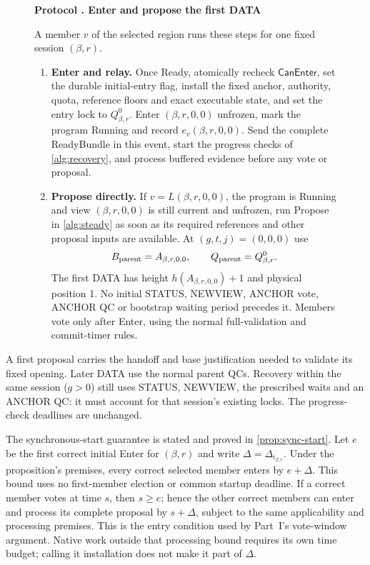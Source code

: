 \documentclass[11pt,a4paper]{article}
\newcommand{\tagg}[1]{\ensuremath{\mathsf{#1}}}
\newcounter{protocol}
\newenvironment{protocol}[3][htbp]{\begin{figure}[#1]\refstepcounter{protocol}\label{#2}
\begin{mdframed}[linewidth=.6pt,skipabove=0pt,skipbelow=0pt,
innertopmargin=7pt,innerbottommargin=7pt]\small
\textbf{Protocol \theprotocol. #3}\par\smallskip}{\end{mdframed}\end{figure}}
\begin{document}
\begin{protocol}[H]{alg:bootstrap}{Enter and propose the first DATA}
A member $v$ of the selected region runs these steps for one fixed
session $(\beta,r)$.
\begin{enumerate}[label=\textbf{\arabic*)},itemsep=3pt]
\item \textbf{Enter and relay.} Once Ready, atomically recheck
\tagg{CanEnter}, set the durable initial-entry flag, install the fixed
anchor, authority, quota, reference floors and exact executable state,
and set the entry lock to $Q^0_{\beta,r}$. Enter $(\beta,r,0,0)$
unfrozen, mark the program Running and record $e_v(\beta,r,0,0)$.
Send the complete ReadyBundle in this event, start the progress checks
of \cref{alg:recovery}, and process buffered evidence before any vote
or proposal.
\item \textbf{Propose directly.} If $v=L(\beta,r,0,0)$, the program is
Running and view $(\beta,r,0,0)$ is still current and unfrozen,
run Propose in \cref{alg:steady} as soon
as its required references and other proposal inputs are available.
At $(g,t,j)=(0,0,0)$ use
\[
 B_{\rm parent}=A_{\beta,r,0,0},\qquad
 Q_{\rm parent}=Q^0_{\beta,r}.
\]
The first DATA has height $h(A_{\beta,r,0,0})+1$ and physical position
1. No initial STATUS, NEWVIEW, ANCHOR vote, ANCHOR QC or bootstrap
waiting period precedes it. Members vote only after Enter, using the
normal full-validation and commit-timer rules.
\end{enumerate}
\end{protocol}
A first proposal carries the handoff and base justification needed to
validate its fixed opening. Later DATA use the normal parent QCs.
Recovery within the same session ($g>0$) still uses STATUS, NEWVIEW,
the prescribed waits and an ANCHOR QC: it must account for that
session's existing locks. The progress-check deadlines are unchanged.

The synchronous-start guarantee is stated and proved in
\cref{prop:sync-start}. Let $e$ be the first correct initial Enter for
$(\beta,r)$ and write $\Delta=\Delta_{i_{\beta,r}}$. Under the
proposition's premises, every correct selected member enters by
$e+\Delta$.
This bound uses no first-member election or common startup deadline.
If a correct member votes at time $s$, then $s\ge e$; hence the other
correct members can enter and process its complete proposal by
$s+\Delta$, subject to the same applicability and processing premises.
This is the entry condition used by Part~I's vote-window argument.
Native work outside that processing bound requires its own time budget;
calling it installation does not make it part of $\Delta$.
\end{document}
